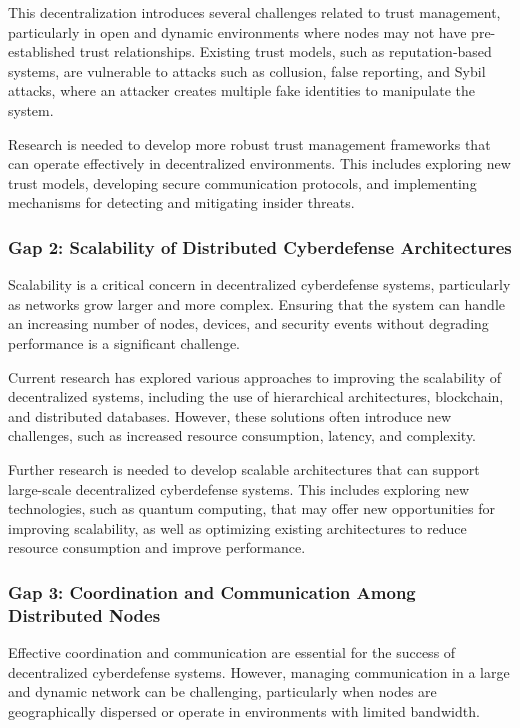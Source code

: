This decentralization introduces several challenges related to trust management, particularly in open and dynamic environments where nodes may not have pre-established trust relationships. Existing trust models, such as reputation-based systems, are vulnerable to attacks such as collusion, false reporting, and Sybil attacks, where an attacker creates multiple fake identities to manipulate the system.

Research is needed to develop more robust trust management frameworks that can operate effectively in decentralized environments. This includes exploring new trust models, developing secure communication protocols, and implementing mechanisms for detecting and mitigating insider threats.

\subsubsection{Gap 2: Scalability of Distributed Cyberdefense Architectures}

Scalability is a critical concern in decentralized cyberdefense systems, particularly as networks grow larger and more complex. Ensuring that the system can handle an increasing number of nodes, devices, and security events without degrading performance is a significant challenge.

Current research has explored various approaches to improving the scalability of decentralized systems, including the use of hierarchical architectures, blockchain, and distributed databases. However, these solutions often introduce new challenges, such as increased resource consumption, latency, and complexity.

Further research is needed to develop scalable architectures that can support large-scale decentralized cyberdefense systems. This includes exploring new technologies, such as quantum computing, that may offer new opportunities for improving scalability, as well as optimizing existing architectures to reduce resource consumption and improve performance.

\subsubsection{Gap 3: Coordination and Communication Among Distributed Nodes}

Effective coordination and communication are essential for the success of decentralized cyberdefense systems. However, managing communication in a large and dynamic network can be challenging, particularly when nodes are geographically dispersed or operate in environments with limited bandwidth.

